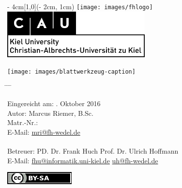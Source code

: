 
\begin{titlepage}
  \vspace*{25ex}
  \begin{textblock*}{\paperwidth - 4cm}[1,0](\paperwidth - 2cm, 1cm)
    \centering
    \texttt{[image: images/fhlogo]}
    \hfill
    \includegraphics[height=2.5cm]{images/logo-cau-kiel.png}
  \end{textblock*}
  \begin{center}
    \sffamily{}
    \texttt{[image: images/blattwerkzeug-caption]} \\[4ex]
    {\Large\docsubtitle}
  \end{center}
  \vspace*{20ex}
  \begin{tabbing}
    \hspace{8em} \= \hspace{14em} \= \hspace{8em} \= \kill

    Eingereicht am: . Oktober 2016 \\[5ex]
    Autor: \> Marcus Riemer, B.Sc. \\
    Matr.-Nr.:  \\
    E-Mail: \> \href{mailto:mri@fh-wedel.de}{mri@fh-wedel.de} \\

    \\
    Betreuer: \> PD. Dr. Frank Huch  \> Prof. Dr. Ulrich Hoffmann \\
    E-Mail: \> \href{mailto:fhu@informatik.uni-kiel.de}{fhu@informatik.uni-kiel.de} \> \href{mailto:uh@fh-wedel.de}{uh@fh-wedel.de}
  \end{tabbing}
  \vfill
  \centering \href{https://creativecommons.org/licenses/by-sa/4.0/}{\includegraphics{images/licenselogo}}
\end{titlepage}

\restoregeometry                 %


